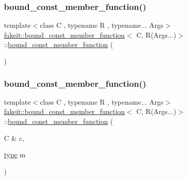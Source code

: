\subsubsection{\texorpdfstring{bound\_const\_member\_function()}{bound\_const\_member\_function()}\hspace{0.1cm}{\footnotesize\ttfamily [1/2]}}
{\footnotesize\ttfamily template$<$class C , typename R , typename... Args$>$ \\
\mbox{\hyperlink{classfakeit_1_1bound__const__member__function}{fakeit\+::bound\+\_\+const\+\_\+member\+\_\+function}}$<$ C, R(Args...)$>$\+::\mbox{\hyperlink{classfakeit_1_1bound__const__member__function}{bound\+\_\+const\+\_\+member\+\_\+function}} (\begin{DoxyParamCaption}{ }\end{DoxyParamCaption})\hspace{0.3cm}{\ttfamily [inline]}}

\mbox{\label{classfakeit_1_1bound__const__member__function_3_01C_00_01R_07Args_8_8_8_08_4_a5bcef539a302dff604324477054c456f}} 
\subsubsection{\texorpdfstring{bound\_const\_member\_function()}{bound\_const\_member\_function()}\hspace{0.1cm}{\footnotesize\ttfamily [2/2]}}
{\footnotesize\ttfamily template$<$class C , typename R , typename... Args$>$ \\
\mbox{\hyperlink{classfakeit_1_1bound__const__member__function}{fakeit\+::bound\+\_\+const\+\_\+member\+\_\+function}}$<$ C, R(Args...)$>$\+::\mbox{\hyperlink{classfakeit_1_1bound__const__member__function}{bound\+\_\+const\+\_\+member\+\_\+function}} (\begin{DoxyParamCaption}\item[{C \&}]{c,  }\item[{\mbox{\hyperlink{classfakeit_1_1bound__const__member__function_3_01C_00_01R_07Args_8_8_8_08_4_a0226a7415039666838a9beafb0acc657}{type}}}]{m }\end{DoxyParamCaption})\hspace{0.3cm}{\ttfamily [inline]}}



